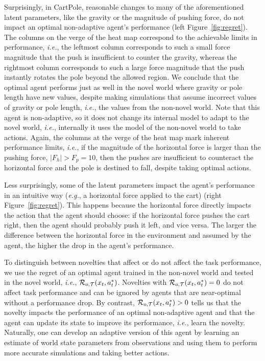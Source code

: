 Surprisingly, in CartPole, reasonable changes to many of the aforementioned latent parameters, like the gravity or the magnitude of pushing force, do not impact an optimal non-adaptive agent’s performance (left Figure~\ref{fig:regret}). 
The columns on the verge of the heat map correspond to the achievable limits in performance, \textit{i.e.}, the leftmost column corresponds to such a small force magnitude that the push is insufficient to counter the gravity, whereas the rightmost column corresponds to such a large force magnitude that the push instantly rotates the pole beyond the allowed region.
We conclude that the optimal agent performs just as well in the novel world where gravity or pole length have new values, despite making simulations that assume incorrect values of gravity or pole length, \textit{i.e.}, the values from the non-novel world. 
Note that this agent is non-adaptive, so it does not change its internal model to adapt to the novel world, \textit{i.e.}, internally it uses the model of the non-novel world to take actions.
Again, the columns at the verge of the heat map mark inherent performance limits, \textit{i.e.}, if the magnitude of the horizontal force is larger than the pushing force, $|F_h|>F_p=10$, then the pushes are insufficient to counteract the horizontal force and the pole is destined to fall, despite taking optimal actions.

Less surprisingly, some of the latent parameters impact the agent’s performance in an intuitive way (\textit{e.g.}, a horizontal force applied to the cart) (right Figure~\ref{fig:regret}). This happens because the horizontal force directly impacts the action that the agent should choose: if the horizontal force pushes the cart right, then the agent should probably push it left, and vice versa. The larger the difference between the horizontal force in the environment and assumed by the agent, the higher the drop in the agent's performance.

To distinguish between novelties that affect or do not affect the task performance, we use the regret of an optimal agent trained in the non-novel world and tested in the novel world, \textit{i.e.}, ${\cal R}_{o,{\cal T}} ( x_t, a^*_t) $. Novelties with ${\cal R}_{o,{\cal T}} ( x_t, a^*_t) = 0$ do not affect task performance and can be ignored by agents that are near-optimal without a performance drop.
By contrast, ${\cal R}_{o,{\cal T}} ( x_t, a^*_t) > 0$ tells us that the novelty impacts the performance of an optimal non-adaptive agent and that the agent can update its state to improve its performance, \textit{i.e.}, learn the novelty.
Naturally, one can develop an adaptive version of this agent by learning an estimate of world state parameters
from observations and using them to perform more accurate simulations and taking better actions. %

